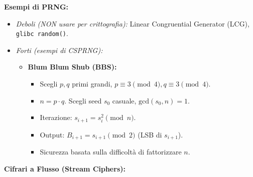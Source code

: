 \documentclass{article}
\begin{document}
    \item \textbf{Esempi di PRNG:}
    \begin{itemize}
        \item \textit{Deboli (NON usare per crittografia):} Linear Congruential Generator (LCG), \texttt{glibc random()}.
        \item \textit{Forti (esempi di CSPRNG):}
        \begin{itemize}
            \item \textbf{Blum Blum Shub (BBS):}
            \begin{itemize}
                \item Scegli $p, q$ primi grandi, $p \equiv 3 \pmod 4, q \equiv 3 \pmod 4$.
                \item $n = p \cdot q$. Scegli seed $s_0$ casuale, $\text{gcd}(s_0, n)=1$.
                \item Iterazione: $s_{i+1} = s_i^2 \pmod n$.
                \item Output: $B_{i+1} = s_{i+1} \pmod 2$ (LSB di $s_{i+1}$).
                \item Sicurezza basata sulla difficoltà di fattorizzare $n$.
            \end{itemize}
        \end{itemize}
    \end{itemize}
    \item \textbf{Cifrari a Flusso (Stream Ciphers):}
\end{document}
